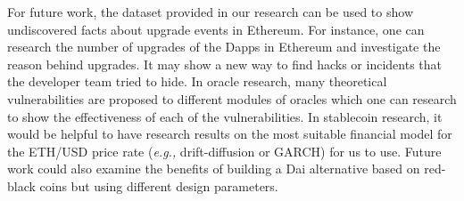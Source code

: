 \documentclass[letterpaper,12pt,onecolumn,final]{report}
\newcommand{\eg}{\textit{e.g.,}\xspace}
\newcommand{\dai}{\textsf{Dai}\xspace}
\begin{document}
For future work, the dataset provided in our research can be used to show undiscovered facts about upgrade events in Ethereum. For instance, one can research the number of upgrades of the Dapps in Ethereum and investigate the reason behind upgrades. It may show a new way to find hacks or incidents that the developer team tried to hide. In oracle research, many theoretical vulnerabilities are proposed to different modules of oracles which one can research to show the effectiveness of each of the vulnerabilities. In stablecoin research, it would be helpful to have research results on the most suitable financial model for the ETH/USD price rate (\eg drift-diffusion or GARCH) for us to use. Future work could also examine the benefits of building a \dai alternative based on red-black coins but using different design parameters.

\clearpage
{}
{}  %
\singlespacing %





\appendix
\setcounter{table}{0}		%
\setcounter{figure}{0}		%
\renewcommand{\thefigure}{\Alph{chapter}.\arabic{figure}} 	%
\renewcommand{\thetable}{\Alph{chapter}.\arabic{table}}		%






\end{document}
